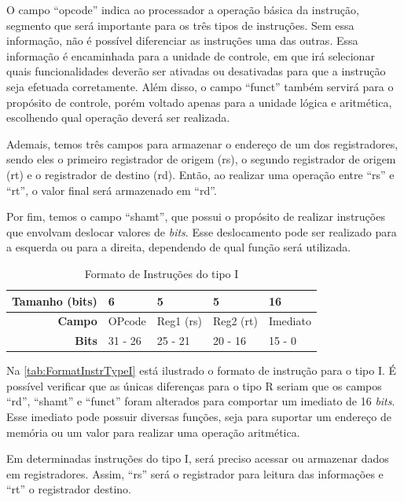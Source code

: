 \documentclass[
	12pt,				%
	oneside,
	a4paper,			%
	english,			%
	french,				%
	spanish,			%
	brazil,				%
	]{abntex2}
\begin{document}
O campo ``opcode'' indica ao processador a operação básica da instrução, segmento que será importante para os três tipos de instruções. Sem essa informação, não é possível diferenciar as instruções uma das outras. Essa informação é encaminhada para a unidade de controle, em que irá selecionar quais funcionalidades deverão ser ativadas ou desativadas para que a instrução seja efetuada corretamente. Além disso, o campo ``funct'' também servirá para o propósito de controle, porém voltado apenas para a unidade lógica e aritmética, escolhendo qual operação deverá ser realizada.

Ademais, temos três campos para armazenar o endereço de um dos registradores, sendo eles o primeiro registrador de origem (rs), o segundo registrador de origem (rt) e o registrador de destino (rd). Então, ao realizar uma operação entre ``rs'' e ``rt'', o valor final será armazenado em ``rd''. 

Por fim, temos o campo ``shamt'', que possui o propósito de realizar instruções que envolvam deslocar valores de \emph{bits}. Esse deslocamento pode ser realizado para a esquerda ou para a direita, dependendo de qual função será utilizada.

\begin{table}[H]
\centering
\ABNTEXfontereduzida
\caption{Formato de Instruções do tipo I} \label{tab:FormatInstrTypeI}
\begin{tabular}{r|p{1.7cm}|p{1.7cm}|p{1.7cm}|p{1.7cm}} 
\textbf{Tamanho (bits)} & 6 & 5 & 5 & 16 \\ \hline
\textbf{Campo} & OPcode & Reg1 (rs) & Reg2 (rt) & Imediato \\ \hline
\textbf{Bits} & 31 - 26 & 25 - 21 & 20 - 16 & 15 - 0\\
\end{tabular}
\end{table}

Na \autoref{tab:FormatInstrTypeI} está ilustrado o formato de instrução para o tipo I. É possível verificar que as únicas diferenças para o tipo R seriam que os campos ``rd'', ``shamt'' e ``funct'' foram alterados para comportar um imediato de 16 \emph{bits}. Esse imediato pode possuir diversas funções, seja para suportar um endereço de memória ou um valor para realizar uma operação aritmética.

Em determinadas instruções do tipo I, será preciso acessar ou armazenar dados em registradores. Assim, ``rs'' será o registrador para leitura das informações e ``rt'' o registrador destino. 
\end{document}
